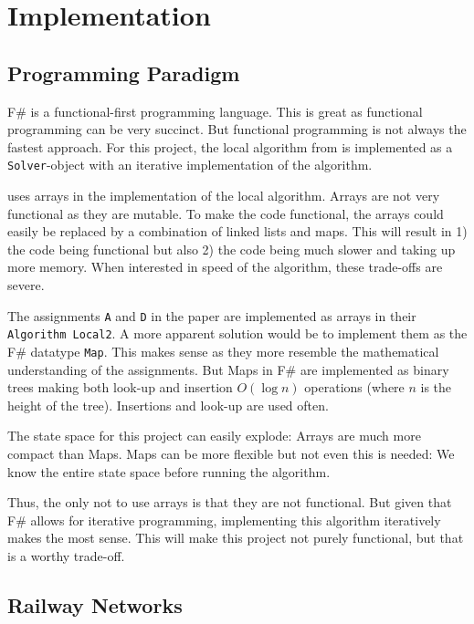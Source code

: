 \chapter{Implementation} %
\label{chpt:implementation}


\section{Programming Paradigm} %
\label{sec:programming-paradigm}

F\# is a functional-first programming language. This is great as functional
programming can be very succinct. But functional programming is not always the
fastest approach. For this project, the local algorithm from \cite{liu1998a} is
implemented as a \texttt{Solver}-object with an iterative implementation of the
algorithm. 

\cite{liu1998a} uses arrays in the implementation of the local algorithm. Arrays
are not very functional as they are mutable. To make the code functional, the
arrays could easily be replaced by a combination of linked lists and maps. This
will result in 1) the code being functional but also 2) the code being much
slower and taking up more memory. When interested in speed of the algorithm,
these trade-offs are severe. 

The assignments \texttt{A} and \texttt{D} in the paper are implemented as arrays
in their \texttt{Algorithm Local2}. A more apparent solution would be to
implement them as the F\# datatype \texttt{Map}. This makes sense as they more
resemble the mathematical understanding of the assignments. But Maps in F\# are
implemented as binary trees making both look-up and insertion $O(\log n)$
operations (where $n$ is the height of the tree). Insertions and look-up are
used often. 


The state space for this project can easily explode: Arrays are much more
compact than Maps. Maps can be more flexible but not even this is needed: We
know the entire state space before running the algorithm. 

Thus, the only not to use arrays is that they are not functional. But given that
F\# allows for iterative programming, implementing this algorithm iteratively
makes the most sense. This will make this project not purely functional, but
that is a worthy trade-off. 


\section{Railway Networks} %

